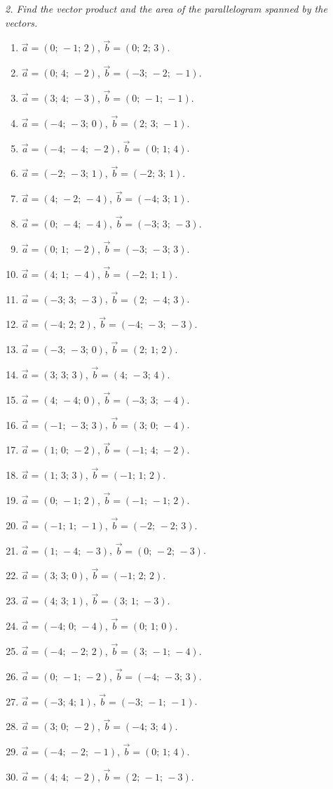 \emph{2. Find the vector product and the area of the parallelogram spanned by the vectors.}
\bigskip
\begin{enumerate}[label=\arabic*., leftmargin=*]
\item $\vec a=(0;\,-1;\,2)$, $\vec b=(0;\,2;\,3)$.
\item $\vec a=(0;\,4;\,-2)$, $\vec b=(-3;\,-2;\,-1)$.
\item $\vec a=(3;\,4;\,-3)$, $\vec b=(0;\,-1;\,-1)$.
\item $\vec a=(-4;\,-3;\,0)$, $\vec b=(2;\,3;\,-1)$.
\item $\vec a=(-4;\,-4;\,-2)$, $\vec b=(0;\,1;\,4)$.
\item $\vec a=(-2;\,-3;\,1)$, $\vec b=(-2;\,3;\,1)$.
\item $\vec a=(4;\,-2;\,-4)$, $\vec b=(-4;\,3;\,1)$.
\item $\vec a=(0;\,-4;\,-4)$, $\vec b=(-3;\,3;\,-3)$.
\item $\vec a=(0;\,1;\,-2)$, $\vec b=(-3;\,-3;\,3)$.
\item $\vec a=(4;\,1;\,-4)$, $\vec b=(-2;\,1;\,1)$.
\item $\vec a=(-3;\,3;\,-3)$, $\vec b=(2;\,-4;\,3)$.
\item $\vec a=(-4;\,2;\,2)$, $\vec b=(-4;\,-3;\,-3)$.
\item $\vec a=(-3;\,-3;\,0)$, $\vec b=(2;\,1;\,2)$.
\item $\vec a=(3;\,3;\,3)$, $\vec b=(4;\,-3;\,4)$.
\item $\vec a=(4;\,-4;\,0)$, $\vec b=(-3;\,3;\,-4)$.
\item $\vec a=(-1;\,-3;\,3)$, $\vec b=(3;\,0;\,-4)$.
\item $\vec a=(1;\,0;\,-2)$, $\vec b=(-1;\,4;\,-2)$.
\item $\vec a=(1;\,3;\,3)$, $\vec b=(-1;\,1;\,2)$.
\item $\vec a=(0;\,-1;\,2)$, $\vec b=(-1;\,-1;\,2)$.
\item $\vec a=(-1;\,1;\,-1)$, $\vec b=(-2;\,-2;\,3)$.
\item $\vec a=(1;\,-4;\,-3)$, $\vec b=(0;\,-2;\,-3)$.
\item $\vec a=(3;\,3;\,0)$, $\vec b=(-1;\,2;\,2)$.
\item $\vec a=(4;\,3;\,1)$, $\vec b=(3;\,1;\,-3)$.
\item $\vec a=(-4;\,0;\,-4)$, $\vec b=(0;\,1;\,0)$.
\item $\vec a=(-4;\,-2;\,2)$, $\vec b=(3;\,-1;\,-4)$.
\item $\vec a=(0;\,-1;\,-2)$, $\vec b=(-4;\,-3;\,3)$.
\item $\vec a=(-3;\,4;\,1)$, $\vec b=(-3;\,-1;\,-1)$.
\item $\vec a=(3;\,0;\,-2)$, $\vec b=(-4;\,3;\,4)$.
\item $\vec a=(-4;\,-2;\,-1)$, $\vec b=(0;\,1;\,4)$.
\item $\vec a=(4;\,4;\,-2)$, $\vec b=(2;\,-1;\,-3)$.
\end{enumerate}

